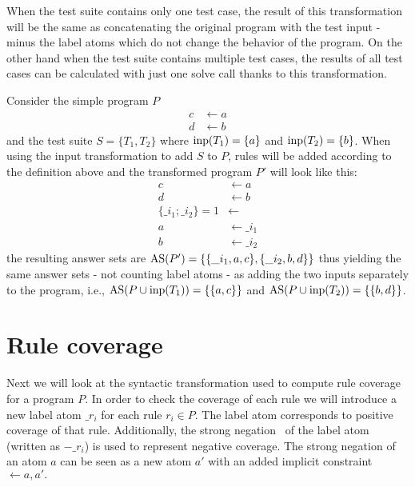 When the test suite contains only one test case, the result of this transformation will be the same as concatenating the original program with the test input - minus the label atoms which do not change the behavior of the program. On the other hand when the test suite contains multiple test cases, the results of all test cases can be calculated with just one solve call thanks to this transformation.

\begin{example}
\label{ex:input transformation}
    Consider the simple program $P$
    \begin{align*}
        c &\leftarrow a \\
        d &\leftarrow b
    \end{align*}
    and the test suite \(S = \{T_1, T_2\}\) where \(\operatorname{inp}(T_1) = \{a\}\) and \(\operatorname{inp}(T_2) = \{b\}\). When using the input transformation to add $S$ to $P$, rules will be added according to the definition above and the transformed program $P'$ will look like this:
    \begin{align*}
        c &\leftarrow a \\
        d &\leftarrow b \\
        \{\_i_1; \_i_2\} = 1 &\leftarrow \\
        a &\leftarrow \_i_1 \\
        b &\leftarrow \_i_2
    \end{align*}
    the resulting answer sets are \(\operatorname{AS}(P') = \{\{\_i_1, a, c\}, \{\_i_2, b, d\}\}\) thus yielding the same answer sets - not counting label atoms - as adding the two inputs separately to the program, i.e., \(\operatorname{AS}(P \cup \operatorname{inp}(T_1)) = \{\{a, c\}\}\) and \(\operatorname{AS}(P \cup \operatorname{inp}(T_2)) = \{\{b, d\}\}\).
\end{example}

\section{Rule coverage}
\label{sec:Computing coverage metrics for propositional programs/Rule coverage}
Next we will look at the syntactic transformation used to compute rule coverage for a program $P$. In order to check the coverage of each rule we will introduce a new label atom $\_r_i$ for each rule $r_i \in P$. The label atom corresponds to positive coverage of that rule. Additionally, the strong negation~\cite{GL91} of the label atom (written as $-\_r_i$) is used to represent negative coverage. The strong negation of an atom $a$ can be seen as a new atom $a'$ with an added implicit constraint $\leftarrow a, a'.$

